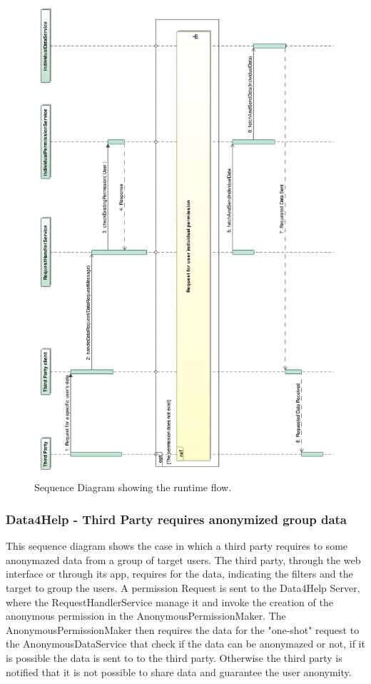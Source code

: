 \documentclass[a4paper]{article}
\begin{document}
\begin{figure}[H]
    \centering
    \includegraphics[width=\linewidth]{SequenceDiagram-RequestForSpecificUserData}
    \caption{Sequence Diagram showing the runtime flow.}
    \label{fig:my_label}
\end{figure}
\clearpage

\subsubsection{Data4Help - Third Party requires anonymized group data}
This sequence diagram shows the case in which a third party requires to some anonymazed data from a group of target users.
The third party, through the web interface or through its app, requires for the data, indicating the filters and the target to group the users.
A permission Request is sent to the Data4Help Server, where the RequestHandlerService manage it and invoke the creation of the anonymous permission in the AnonymousPermissionMaker.
The AnonymousPermissionMaker then requires the data for the "one-shot" request to the AnonymousDataService that check if the data can be anonymazed or not, if it is possible the data is sent to to the third party. Otherwise the third party is notified that it is not possible to share data and guarantee the user anonymity.
\end{document}
